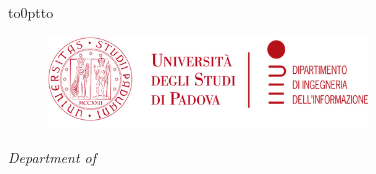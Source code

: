 \begin{titlingpage}
	\begin{center}
		\vbox to0pt{\vbox to\vss}
		\vspace{0.3cm}
		\begin{figure}
			\centering
			\vspace{0.2cm}
			\includegraphics[height=2.45cm]{static/unipd/unipd-dei.png}%
		\end{figure}
		{\scshape\Large \UnivName \par}\vspace{0.25cm} %
		\textit{\Large Department of \DeptName}\\
		\vspace{0.25cm} %
		\textbf{\Large \DegreeName}\\[1.6cm] %

		\vspace{1cm} %
		{\Huge{\bfseries{\textcolor{SchoolColor}{\Title}}} \par}\vspace{0.7cm} %
		\vspace{2cm} %


\end{center}
\end{titlingpage}
